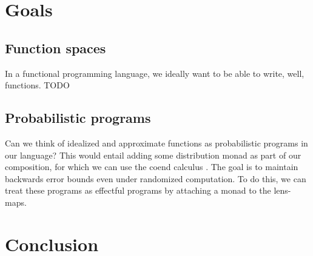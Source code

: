 \documentclass[a4paper]{article}
\begin{document}
\section{Goals}
\subsection{Function spaces}
In a functional programming language, we ideally want to be able to write, well, functions. TODO

\subsection{Probabilistic programs}
Can we think of idealized and approximate functions as probabilistic programs in our language? This would entail adding some distribution monad as part of our composition, for which we can use the coend calculus \cite{loregian2021co}. The goal is to maintain backwards error bounds even under randomized computation. To do this, we can treat these programs as effectful programs by attaching a monad to the lens-maps. 

\section{Conclusion}

\printbibliography
\end{document}

